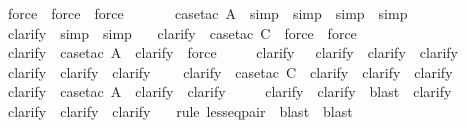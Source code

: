 \begin{isabellebody}
\ \ \ \ \isamarkupfalse \ force\ \isamarkupfalse \ force\ \isamarkupfalse \ force\isanewline
\ \ \isamarkupfalse \ {}\isanewline
\ \ \isamarkupfalse \ {\isacharparenleft}case{\isacharunderscore}tac\ A{\isacharparenright}\ \isamarkupfalse \ simp\ \isamarkupfalse \ simp\ \isamarkupfalse \ simp\ \isamarkupfalse \ simp\ \isanewline
\ \ \ \ \isamarkupfalse \ clarify\ \isamarkupfalse \ simp\ \isamarkupfalse \ simp\isanewline
\ \ \isamarkupfalse \ clarify\ \isamarkupfalse \ {\isacharparenleft}case{\isacharunderscore}tac\ C{\isacharparenright}\ \isamarkupfalse \ force\ \isamarkupfalse \ force\isanewline
\ \ \ \ \isamarkupfalse \ clarify\ \isamarkupfalse \ {\isacharparenleft}case{\isacharunderscore}tac\ A{\isacharparenright}\ \isamarkupfalse \ clarify\ \isamarkupfalse \ force\isanewline
\ \ \ \ \isamarkupfalse \ clarify\ \isamarkupfalse \ \isamarkupfalse \ clarify\ \isamarkupfalse \ clarify\ \isamarkupfalse \ clarify\isanewline
\ \ \ \ \isamarkupfalse \ clarify\ \isamarkupfalse \ clarify\ \isamarkupfalse \ clarify\ \isanewline
\ \ \isamarkupfalse \ clarify\ \isamarkupfalse \ {\isacharparenleft}case{\isacharunderscore}tac\ C{\isacharparenright}\ \isamarkupfalse \ clarify\ \isamarkupfalse \ clarify\ \isamarkupfalse \ clarify\isanewline
\ \ \ \ \isamarkupfalse \ clarify\ \isamarkupfalse \ {\isacharparenleft}case{\isacharunderscore}tac\ A{\isacharparenright}\ \isamarkupfalse \ clarify\ \isamarkupfalse \ clarify\isanewline
\ \ \ \ \isamarkupfalse \ clarify\ \isamarkupfalse \ clarify\ \isamarkupfalse \ blast\ \isamarkupfalse \ clarify\isanewline
\ \ \ \ \isamarkupfalse \ clarify\ \isamarkupfalse \ clarify\ \isamarkupfalse \ clarify\isanewline
\ \ \isamarkupfalse \ {\isacharparenleft}rule\ less{\isacharunderscore}eq{\isacharunderscore}pair{\isacharparenright}\ \isamarkupfalse \ blast\ \isamarkupfalse \ blast\isanewline

\end{isabellebody}
